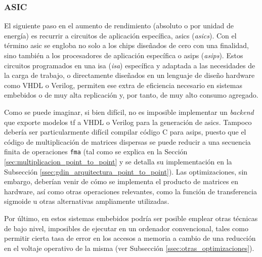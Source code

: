 \subsubsection{ASIC}
\label{sssec:heterogeneas_asic}
El siguiente paso en el aumento de rendimiento (absoluto o por unidad de energía) es recurrir a circuitos de aplicación específica, \acrshort{asic}s (\textit{\acrlong{asic}s}). Con el término \acrshort{asic} se engloba no solo a los chips diseñados de cero con una finalidad, sino también a los procesadores de aplicación específica o \acrshort{asip}s (\textit{\acrlong{asip}s}). Estos circuitos programados en una \acrshort{isa} (\textit{\acrlong{isa}}) específica y adaptada a las necesidades de la carga de trabajo, o directamente diseñados en un lenguaje de diseño hardware como VHDL o Verilog, permiten ese extra de eficiencia necesario en sistemas embebidos o de muy alta replicación y, por tanto, de muy alto consumo agregado.

Como se puede imaginar, si bien difícil, no es imposible implementar un \textit{\gls{backend}} que exporte modelos \acrlong{tf} a VHDL o Verilog para la generación de \acrshort{asic}s. Tampoco debería ser particularmente difícil compilar código C para \acrshort{asip}s, puesto que el código de multiplicación de matrices dispersas se puede reducir a una secuencia finita de operaciones \texttt{\acrshort{fma}} (tal como se explica en la Sección \ref{sec:multiplicacion_point_to_point} y se detalla su implementación en la Subsección \ref{ssec:gdin_arquitectura_point_to_point}). Las optimizaciones, sin embargo, deberían venir de cómo se implementa el producto de matrices en hardware, así como otras operaciones relevantes, como la función de transferencia sigmoide u otras alternativas ampliamente utilizadas.

Por último, en estos sistemas embebidos podría ser posible emplear otras técnicas de bajo nivel, imposibles de ejecutar en un ordenador convencional, tales como permitir cierta tasa de error en los accesos a memoria a cambio de una reducción en el voltaje operativo de la misma (ver Subsección \ref{ssec:otras_optimizaciones}).